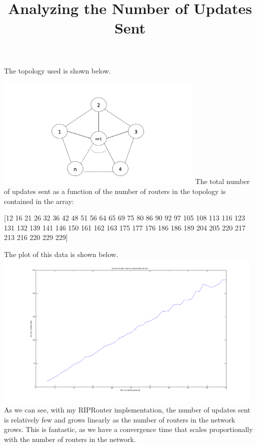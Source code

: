 \documentclass[]{article}
\begin{document}
\title{Analyzing the Number of Updates Sent}
\maketitle
\newpage
The topology used is shown below. \\
\linebreak

\begin{center}
\includegraphics[width=10cm]{topo.png}
\linebreak
The total number of updates sent as a function of the number of routers in the topology is contained in the array: 

[12
16
21
26
32
36
42
48
51
56
64
65
69
75
80
86
90
92
97
105
108
113
116
123
131
132
139
141
146
150
161
162
163
175
177
176
186
186
189
204
205
220
217
213
216
220
229
229]
\linebreak

The plot of this data is shown below.
\includegraphics[width=13cm]{plot.png}
\linebreak
As we can see, with my RIPRouter implementation, the number of updates sent is relatively few and grows linearly as the number of routers in the network grows. This is fantastic, as we have a convergence time that scales proportionally with the number of routers in the network.
\end{center}
\end{document}
